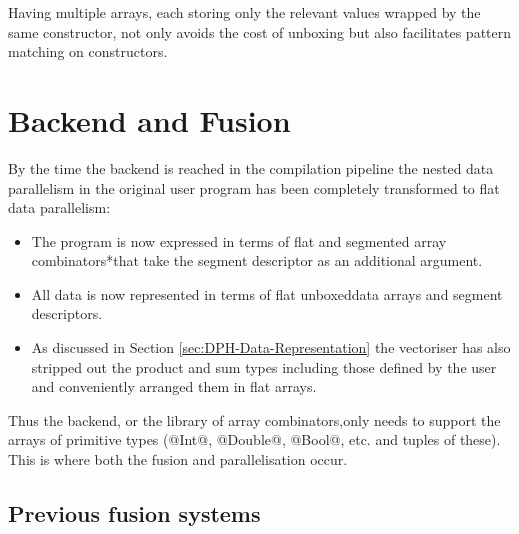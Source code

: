 \documentclass[preamble.tex]{subfiles}
\begin{document}
Having multiple arrays, each storing only the relevant values wrapped by the same constructor, not only avoids the cost of unboxing but also facilitates pattern matching on constructors.


\clearpage

\section{Backend and Fusion}

By the time the backend is reached in the compilation pipeline the nested data parallelism in the original user program has been completely transformed to flat data parallelism:
\begin{itemize}
\item The program is now expressed in terms of flat and \*segmented array combinators*\isegcomb that take the segment descriptor as an additional argument.
\item All data is now represented in terms of flat unboxed\iboxing data arrays and segment descriptors.\isegd
\item As discussed in Section \ref{sec:DPH-Data-Representation} the vectoriser has also stripped out the product and sum types including those defined by the user and conveniently arranged them in flat arrays.
\end{itemize}

Thus the backend, or the library of array combinators,\icomb only needs to support the arrays of primitive types (@Int@, @Double@, @Bool@, etc. and tuples of these). This is where both the fusion and parallelisation occur.




\subsection{Previous fusion systems}
\label{sec:DPH-fusion-levels}
\end{document}

